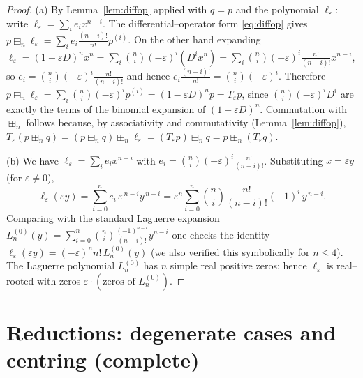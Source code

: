 \documentclass[12pt]{article}
\theoremstyle{definition}
\newcommand{\boxp}{\boxplus_n}
\begin{document}
\begin{proof}
(a) By Lemma~\ref{lem:diffop} applied with $q=p$ and the polynomial $\ell_\varepsilon$:
write $\ell_\varepsilon=\sum_i e_i x^{n-i}$. The differential--operator form
\eqref{eq:diffop} gives $p\boxp\ell_\varepsilon=\sum_i e_i\frac{(n-i)!}{n!}p^{(i)}$. On the
other hand expanding $\ell_\varepsilon=(1-\varepsilon D)^n x^n=\sum_i\binom{n}{i}
(-\varepsilon)^i (D^i x^n)=\sum_i\binom{n}{i}(-\varepsilon)^i\frac{n!}{(n-i)!}x^{n-i}$, so
$e_i=\binom{n}{i}(-\varepsilon)^i\frac{n!}{(n-i)!}$ and hence
$e_i\frac{(n-i)!}{n!}=\binom{n}{i}(-\varepsilon)^i$. Therefore
$p\boxp\ell_\varepsilon=\sum_i\binom{n}{i}(-\varepsilon)^i p^{(i)}
=(1-\varepsilon D)^n p=T_\varepsilon p$, since $\binom{n}{i}(-\varepsilon)^i D^i$ are exactly
the terms of the binomial expansion of $(1-\varepsilon D)^n$. Commutation with $\boxp$
follows because, by associativity and commutativity (Lemma~\ref{lem:diffop}),
$T_\varepsilon(p\boxp q)=(p\boxp q)\boxp\ell_\varepsilon=(T_\varepsilon p)\boxp q
=p\boxp(T_\varepsilon q)$.

(b) We have $\ell_\varepsilon=\sum_i e_i x^{n-i}$ with
$e_i=\binom{n}{i}(-\varepsilon)^i\frac{n!}{(n-i)!}$. Substituting $x=\varepsilon y$ (for
$\varepsilon\neq0$),
\[
\ell_\varepsilon(\varepsilon y)=\sum_{i=0}^n e_i\,\varepsilon^{\,n-i}y^{\,n-i}
=\varepsilon^n\sum_{i=0}^n\binom{n}{i}\frac{n!}{(n-i)!}(-1)^i\,y^{\,n-i}.
\]
Comparing with the standard Laguerre expansion
$L_n^{(0)}(y)=\sum_{i=0}^n\binom{n}{i}\frac{(-1)^{n-i}}{(n-i)!}y^{n-i}$ one checks the
identity $\ell_\varepsilon(\varepsilon y)=(-\varepsilon)^n n!\,L_n^{(0)}(y)$ (we also
verified this symbolically for $n\le4$). The Laguerre polynomial $L_n^{(0)}$ has $n$ simple
real positive zeros; hence $\ell_\varepsilon$ is real--rooted with zeros
$\varepsilon\cdot(\text{zeros of }L_n^{(0)})$.
\end{proof}

\section{Reductions: degenerate cases and centring (complete)}\label{sec:boundary}
\end{document}
